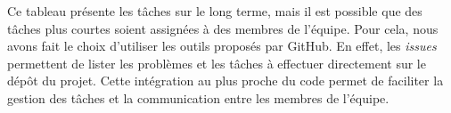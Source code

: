 Ce tableau présente les tâches sur le long terme, mais il est possible que des tâches plus courtes soient assignées à des membres de l'équipe.
Pour cela, nous avons fait le choix d'utiliser les outils proposés par GitHub.
En effet, les \textit{issues} permettent de lister les problèmes et les tâches à effectuer directement sur le dépôt du projet.
Cette intégration au plus proche du code permet de faciliter la gestion des tâches et la communication entre les membres de l'équipe.
\\








    








